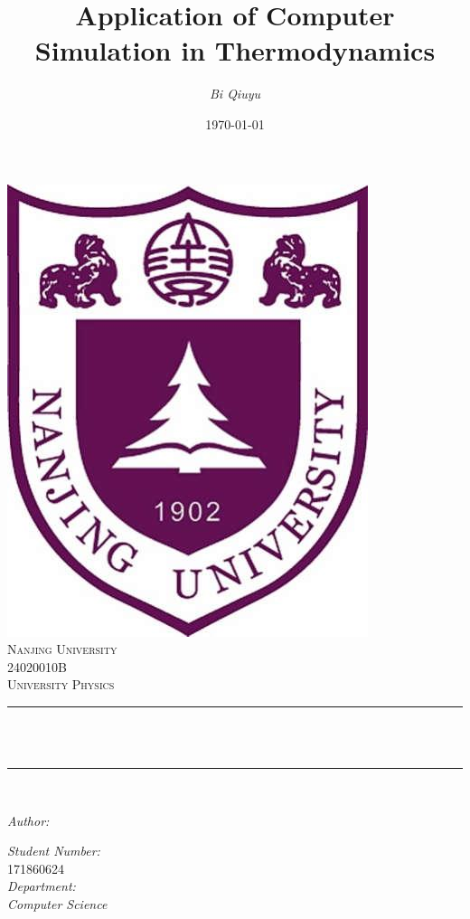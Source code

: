 \documentclass[12pt]{ctexart}
\title{Application of Computer Simulation in Thermodynamics}								%
\author{\emph{Bi Qiuyu}}								%
\date{\today}											%
\makeatletter
\let\thetitle\@title
\let\theauthor\@author
\makeatother
\begin{document}

\begin{titlepage}
	\centering
    \vspace*{0.5 cm}
    \includegraphics[scale = 0.2]{NJU.jpg}\\[0.8 cm]	%
    \textsc{\LARGE Nanjing University}\\[2.0 cm]	%
    \textsc{\large 24020010B}\\[0.5 cm]				%
	\textsc{\large University Physics \uppercase\expandafter{}}\\[0.5 cm]				%
	\rule{\linewidth}{0.2 mm} \\[0.4 cm]
    {\huge \bfseries \thetitle}\\
	\rule{\linewidth}{0.2 mm} \\[1.5 cm]
	
	\begin{minipage}{0.4\textwidth}
		\begin{flushleft} \large
			\emph{Author:}\\
			\theauthor
			\end{flushleft}
			\end{minipage}
			\begin{minipage}{0.4\textwidth}
			\begin{flushright} \large
                \emph{Student Number:} \\
			171860624\\									%
                \emph{Department:} \\
                \emph{Computer Science}
		\end{flushright}
	\end{minipage}\\[2 cm]
	

\end{titlepage}
\end{document}
